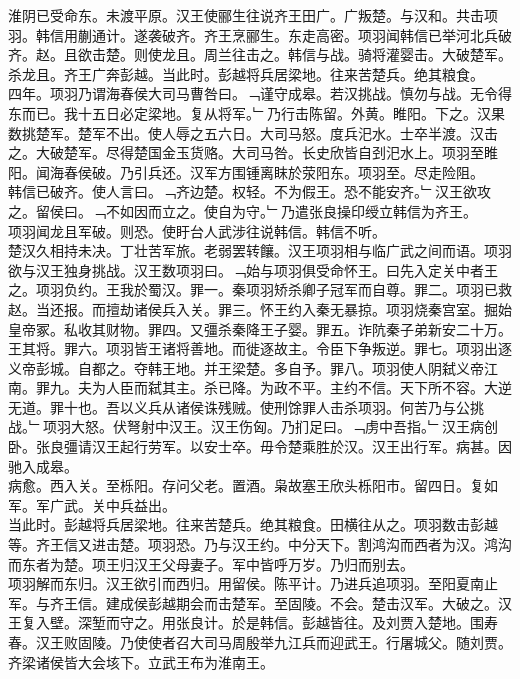 \documentclass{zhvt-classic}
\begin{document}
\hspace*{2em}淮阴已受命东。未渡平原。汉王使郦生往说齐王田广。广叛楚。与汉和。共击项羽。韩信用蒯通计。遂袭破齐。齐王烹郦生。东走高密。项羽闻韩信已举河北兵破齐。赵。且欲击楚。则使龙且。周兰往击之。韩信与战。骑将灌婴击。大破楚军。杀龙且。齐王广奔彭越。当此时。彭越将兵居梁地。往来苦楚兵。绝其粮食。\\
\hspace*{2em}四年。项羽乃谓海春侯大司马曹咎曰。﹁谨守成皋。若汉挑战。慎勿与战。无令得东而已。我十五日必定梁地。复从将军。﹂乃行击陈留。外黄。睢阳。下之。汉果数挑楚军。楚军不出。使人辱之五六日。大司马怒。度兵汜水。士卒半渡。汉击之。大破楚军。尽得楚国金玉货赂。大司马咎。长史欣皆自刭汜水上。项羽至睢阳。闻海春侯破。乃引兵还。汉军方围锺离眜於荥阳东。项羽至。尽走险阻。\\
\hspace*{2em}韩信已破齐。使人言曰。﹁齐边楚。权轻。不为假王。恐不能安齐。﹂汉王欲攻之。留侯曰。﹁不如因而立之。使自为守。﹂乃遣张良操印绶立韩信为齐王。\\
\hspace*{2em}项羽闻龙且军破。则恐。使盱台人武涉往说韩信。韩信不听。\\
\hspace*{2em}楚汉久相持未决。丁壮苦军旅。老弱罢转饟。汉王项羽相与临广武之间而语。项羽欲与汉王独身挑战。汉王数项羽曰。﹁始与项羽俱受命怀王。曰先入定关中者王之。项羽负约。王我於蜀汉。罪一。秦项羽矫杀卿子冠军而自尊。罪二。项羽已救赵。当还报。而擅劫诸侯兵入关。罪三。怀王约入秦无暴掠。项羽烧秦宫室。掘始皇帝冢。私收其财物。罪四。又彊杀秦降王子婴。罪五。诈阬秦子弟新安二十万。王其将。罪六。项羽皆王诸将善地。而徙逐故主。令臣下争叛逆。罪七。项羽出逐义帝彭城。自都之。夺韩王地。并王梁楚。多自予。罪八。项羽使人阴弑义帝江南。罪九。夫为人臣而弑其主。杀已降。为政不平。主约不信。天下所不容。大逆无道。罪十也。吾以义兵从诸侯诛残贼。使刑馀罪人击杀项羽。何苦乃与公挑战。﹂项羽大怒。伏弩射中汉王。汉王伤匈。乃扪足曰。﹁虏中吾指。﹂汉王病创卧。张良彊请汉王起行劳军。以安士卒。毋令楚乘胜於汉。汉王出行军。病甚。因驰入成皋。\\
\hspace*{2em}病愈。西入关。至栎阳。存问父老。置酒。枭故塞王欣头栎阳市。留四日。复如军。军广武。关中兵益出。\\
\hspace*{2em}当此时。彭越将兵居梁地。往来苦楚兵。绝其粮食。田横往从之。项羽数击彭越等。齐王信又进击楚。项羽恐。乃与汉王约。中分天下。割鸿沟而西者为汉。鸿沟而东者为楚。项王归汉王父母妻子。军中皆呼万岁。乃归而别去。\\
\hspace*{2em}项羽解而东归。汉王欲引而西归。用留侯。陈平计。乃进兵追项羽。至阳夏南止军。与齐王信。建成侯彭越期会而击楚军。至固陵。不会。楚击汉军。大破之。汉王复入壁。深堑而守之。用张良计。於是韩信。彭越皆往。及刘贾入楚地。围寿春。汉王败固陵。乃使使者召大司马周殷举九江兵而迎武王。行屠城父。随刘贾。齐梁诸侯皆大会垓下。立武王布为淮南王。\\
\end{document}
